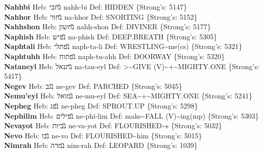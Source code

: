 {\textbf{Nahhbi} Heb: {\large\H נחבי} nahh-bi Def: HIDDEN \{Strong's: 5147\}\hfill{}\\

\textbf{Nahhor} Heb: {\large\H נחור} na-hhor Def: SNORTING \{Strong's: 5152\}\hfill{}\\

\textbf{Nahhshon} Heb: {\large\H נחשון} nahh-shon Def: DIVINER \{Strong's: 5177\}\hfill{}\\

\textbf{Naphish} Heb: {\large\H נפיש} na-phish Def: DEEP.BREATH \{Strong's: 5305\}\hfill{}\\

\textbf{Naphtali} Heb: {\large\H נפתלי} naph-ta-li Def: WRESTLING\textasciitilde{}me(cs) \{Strong's: 5321\}\hfill{}\\

\textbf{Naphtuhh} Heb: {\large\H נפתוח} naph-tu-ahh Def: DOORWAY \{Strong's: 5320\}\hfill{}\\

\textbf{Nataneyl} Heb: {\large\H נתנאל} na-tan-eyl Def: >\textasciitilde{}GIVE (V)\textasciitilde{}+\textasciitilde{}MIGHTY.ONE \{Strong's: 5417\}\hfill{}\\

\textbf{Negev} Heb: {\large\H נגב} ne-gev Def: PARCHED \{Strong's: 5045\}\hfill{}\\

\textbf{Nemu'eyl} Heb: {\large\H נמואל} ne-mu-eyl Def: SEA\textasciitilde{}+\textasciitilde{}MIGHTY.ONE \{Strong's: 5241\}\hfill{}\\

\textbf{Nepheg} Heb: {\large\H נפג} ne-pheg Def: SPROUT.UP \{Strong's: 5298\}\hfill{}\\

\textbf{Nephilim} Heb: {\large\H נפילים} ne-phi-lim Def: make\textasciitilde{}FALL (V)\textasciitilde{}ing(mp) \{Strong's: 5303\}\hfill{}\\

\textbf{Nevayot} Heb: {\large\H נביות} ne-va-yot Def: FLOURISHED\textasciitilde{}s \{Strong's: 5032\}\hfill{}\\

\textbf{Nevo} Heb: {\large\H נבו} ne-vo Def: FLOURISHED\textasciitilde{}him \{Strong's: 5015\}\hfill{}\\

\textbf{Nimrah} Heb: {\large\H נמרה} nim-rah Def: LEOPARD \{Strong's: 1039\}\hfill{}\\

}
